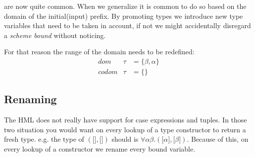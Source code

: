 are now quite common. When we generalize it is common to do so based on the domain of the initial(input) prefix. By promoting types we introduce new type variables that need to be taken in account, if not we might accidentally disregard a \emph{scheme bound} without noticing.

For that reason the range of the domain needs to be redefined:
\begin{eqnarray*}
dom   &\tau& = \{\beta, \alpha\}\\
codom &\tau& = \{\}
\end{eqnarray*}
\subsection{Renaming}
\label{renaming}

The HML does not really have support for case expressions and tuples. In those two situation you would want on every lookup of a type constructor to return a fresh type. e.g. the type of $(\lbrack \rbrack, \lbrack \rbrack)$ should is $\forall \alpha \beta . (\lbrack \alpha \rbrack, \lbrack \beta \rbrack)$. Because of this, on every lookup of a constructor we rename every bound variable.
